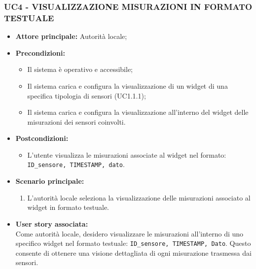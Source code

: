 \subsubsection{UC4 - VISUALIZZAZIONE MISURAZIONI IN FORMATO TESTUALE}
\begin{itemize}
      \item \textbf{Attore principale:} Autorità locale;
      \item \textbf{Precondizioni:}
            \begin{itemize}
                  \item Il sistema è operativo e accessibile;
                  \item Il sistema carica e configura la visualizzazione di un widget di una specifica tipologia di sensori (UC1.1.1);
                  \item Il sistema carica e configura la visualizzazione all'interno del widget delle misurazioni dei sensori coinvolti.
            \end{itemize}
      \item \textbf{Postcondizioni:}
            \begin{itemize}
                  \item L'utente visualizza le misurazioni associate al widget nel formato: \texttt{ID\_sensore, TIMESTAMP, dato}.
            \end{itemize}
      \item \textbf{Scenario principale:}
            \begin{enumerate}
                  \item L'autorità locale seleziona la visualizzazione delle misurazioni associato al widget in formato testuale.
            \end{enumerate}
      \item \textbf{User story associata:} \\
            Come autorità locale, desidero visualizzare le misurazioni all'interno di uno specifico widget nel formato testuale: \texttt{ID\_sensore, TIMESTAMP, Dato}. Questo consente di ottenere una visione dettagliata di ogni misurazione trasmessa dai sensori.
\end{itemize}